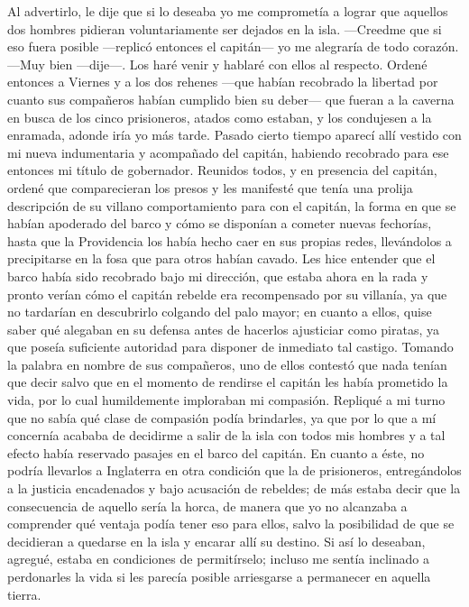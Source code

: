 \documentclass{novela}
\begin{document}
    Al advertirlo, le dije que si lo deseaba yo me comprometía a lograr que aquellos dos hombres pidieran voluntariamente ser dejados en la isla.
    —Creedme que si eso fuera posible —replicó entonces el capitán— yo me alegraría de todo corazón.
    —Muy bien —dije—. Los haré venir y hablaré con ellos al respecto. Ordené entonces a Viernes y a los dos rehenes —que habían recobrado la libertad por cuanto sus compañeros habían cumplido bien su deber— que fueran a la caverna en busca de los cinco prisioneros, atados como estaban, y los condujesen a la enramada, adonde iría yo más tarde.
    Pasado cierto tiempo aparecí allí vestido con mi nueva indumentaria y acompañado del capitán, habiendo recobrado para ese entonces mi título de gobernador.
    Reunidos todos, y en presencia del capitán, ordené que comparecieran los presos y les manifesté que tenía una prolija descripción de su villano comportamiento para con el capitán, la forma en que se habían apoderado del barco y cómo se disponían a cometer nuevas fechorías, hasta que la Providencia los había hecho caer en sus propias redes, llevándolos a precipitarse en la fosa que para otros habían cavado.
    Les hice entender que el barco había sido recobrado bajo mi dirección, que estaba ahora en la rada y pronto verían cómo el capitán rebelde era recompensado por su villanía, ya que no tardarían en descubrirlo colgando del palo mayor; en cuanto a ellos, quise saber qué alegaban en su defensa antes de hacerlos ajusticiar como piratas, ya que poseía suficiente autoridad para disponer de inmediato tal castigo.
    Tomando la palabra en nombre de sus compañeros, uno de ellos contestó que nada tenían que decir salvo que en el momento de rendirse el capitán les había prometido la vida, por lo cual humildemente imploraban mi compasión. Repliqué a mi turno que no sabía qué clase de compasión podía brindarles, ya que por lo que a mí concernía acababa de decidirme a salir de la isla con todos mis hombres y a tal efecto había reservado pasajes en el barco del capitán. En cuanto a éste, no podría llevarlos a Inglaterra en otra condición que la de prisioneros, entregándolos a la justicia encadenados y bajo acusación de rebeldes; de más estaba decir que la consecuencia de aquello sería la horca, de manera que yo no alcanzaba a comprender qué ventaja podía tener eso para ellos, salvo la posibilidad de que se decidieran a quedarse en la isla y encarar allí su destino. Si así lo deseaban, agregué, estaba en condiciones de permitírselo; incluso me sentía inclinado a perdonarles la vida si les parecía posible arriesgarse a permanecer en aquella tierra.
\end{document}
